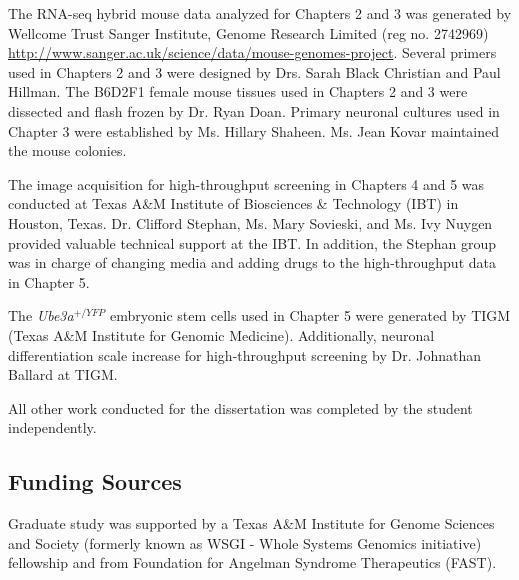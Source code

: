 The RNA-seq hybrid mouse data analyzed for Chapters 2 and 3 was generated by Wellcome Trust Sanger Institute, Genome Research Limited (reg no. 2742969) \url{http://www.sanger.ac.uk/science/data/mouse-genomes-project}. Several primers used in Chapters 2 and 3 were designed by Drs. Sarah Black Christian and Paul Hillman. The B6D2F1 female mouse tissues used in Chapters 2 and 3 were dissected and flash frozen by Dr. Ryan Doan. Primary neuronal cultures used in Chapter 3 were established by Ms. Hillary Shaheen. Ms. Jean Kovar maintained the mouse colonies. 

The image acquisition for high-throughput screening in Chapters 4 and 5 was conducted at Texas A\&M Institute of Biosciences \& Technology (IBT) in Houston, Texas. Dr. Clifford Stephan, Ms. Mary Sovieski, and Ms. Ivy Nuygen provided valuable technical support at the IBT. In addition, the Stephan group was in charge of changing media and adding drugs to the high-throughput data in Chapter 5.

The \textit{Ube3a$^{+/YFP}$} embryonic stem cells used in Chapter 5 were generated by TIGM (Texas A\&M Institute for Genomic Medicine). Additionally, neuronal differentiation scale increase for high-throughput screening by Dr. Johnathan Ballard at TIGM. 

All other work conducted for the dissertation was completed by the student independently.
\subsection*{Funding Sources}
Graduate study was supported by a Texas A\&M Institute for Genome Sciences and Society (formerly known as WSGI - Whole Systems Genomics initiative) fellowship and from Foundation for Angelman Syndrome Therapeutics (FAST).
\pagebreak{}
